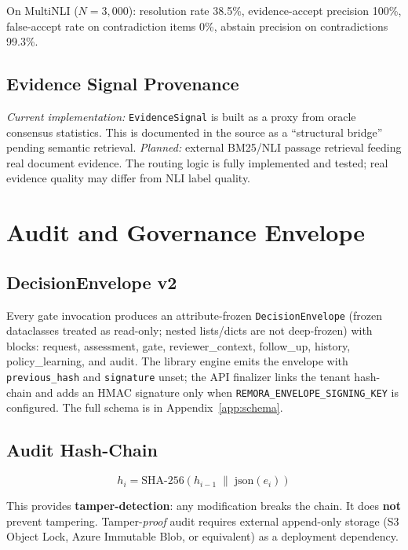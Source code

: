 \documentclass[10pt,twocolumn]{article}
\begin{document}
On MultiNLI ($N=3{,}000$): resolution rate 38.5\%, evidence-accept
precision 100\%, false-accept rate on contradiction items 0\%,
abstain precision on contradictions 99.3\%.

\subsection{Evidence Signal Provenance}

\emph{Current implementation:} \texttt{EvidenceSignal} is built as a
proxy from oracle consensus statistics. This is documented in the
source as a ``structural bridge'' pending semantic retrieval.
\emph{Planned:} external BM25/NLI passage retrieval feeding real
document evidence. The routing logic is fully implemented and tested;
real evidence quality may differ from NLI label quality.

\section{Audit and Governance Envelope}
\label{sec:audit}

\subsection{DecisionEnvelope v2}

Every gate invocation produces an attribute-frozen
\texttt{DecisionEnvelope} (frozen dataclasses treated as read-only;
nested lists/dicts are not deep-frozen) with blocks: request, assessment,
gate, reviewer\_context, follow\_up, history, policy\_learning, and audit.
The library engine emits the envelope with \texttt{previous\_hash} and
\texttt{signature} unset; the API finalizer links the tenant hash-chain
and adds an HMAC signature only when
\texttt{REMORA\_ENVELOPE\_SIGNING\_KEY} is configured.
The full schema is in Appendix~\ref{app:schema}.

\subsection{Audit Hash-Chain}

\begin{equation}
  h_i = \text{SHA-256}(h_{i-1} \;\|\; \mathrm{json}(e_i))
\end{equation}

This provides \textbf{tamper-detection}: any modification breaks the
chain. It does \textbf{not} prevent tampering. Tamper-\emph{proof}
audit requires external append-only storage (S3 Object Lock, Azure
Immutable Blob, or equivalent) as a deployment dependency.
\end{document}
